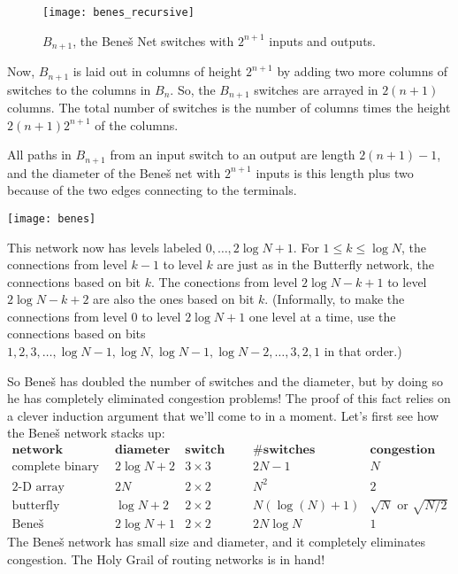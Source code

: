 \begin{figure}
\texttt{[image: benes\_recursive]}
\caption{$B_{n+1}$, the Bene\v{s} Net switches with $2^{n+1}$ inputs
and outputs.}
\label{fig:benes-recursive}
\end{figure}

Now, $B_{n+1}$ is laid out in columns of height $2^{n+1}$ by adding two
more columns of switches to the columns in $B_n$.  So, the $B_{n+1}$
switches are arrayed in $2(n+1)$ columns.  The total number of
switches is the number of columns times the height $2(n+1)2^{n+1}$ of the columns.

All paths in $B_{n+1}$ from an input switch to an output are
length $2(n+1)-1$, and the diameter of the Bene\v{s} net with
$2^{n+1}$ inputs is this length plus two because of the two edges
connecting to the terminals.

\begin{editingnotes}

\texttt{[image: benes]}


This network now has levels labeled $0,\dots ,2 \log N + 1$. For $1 \leq k
\leq \log N$, the connections from level $k-1$ to level $k$ are just as in
the Butterfly network, the connections based on bit $k$. The conections
from level $2 \log N - k + 1$ to level $2 \log N - k + 2$ are also the
ones based on bit $k$.  (Informally, to make the connections from level
$0$ to level $2 \log N +1$ one level at a time, use the connections based
on bits $1,2,3,\dots, \log N - 1, \log N, \log N - 1, \log N - 2, \dots,
3,2,1$ in that order.)

\end{editingnotes}

So Bene\v{s} has doubled the number of switches and the diameter, but
by doing so he has completely eliminated congestion problems!  The proof
of this fact relies on a clever induction argument that we'll come to
in a moment.  Let's first see how the Bene\v{s} network stacks up:
%
\[
\begin{array}{r|c|c|c|c}
\textbf{network} &
\textbf{diameter} &
\textbf{switch size} &
\textbf{\# switches} &
\textbf{congestion} \\ \hline
\text{complete binary tree} & 2 \log N + 2 & 3 \times 3 & 2N - 1 & N \\
\text{2-D array} & 2 N & 2 \times 2 & N^2 & 2 \\
\text{butterfly} & \log N + 2 & 2 \times 2 & N (\log(N) + 1) & \sqrt{N} \text{ or } \sqrt{N/2} \\
\text{Bene\v{s}} & 2 \log N + 1 & 2 \times 2 &  2 N \log N & 1
\end{array}
\]
%
The Bene\v{s} network has small size and diameter, and it completely
eliminates congestion.  The Holy Grail of routing networks is in hand!


